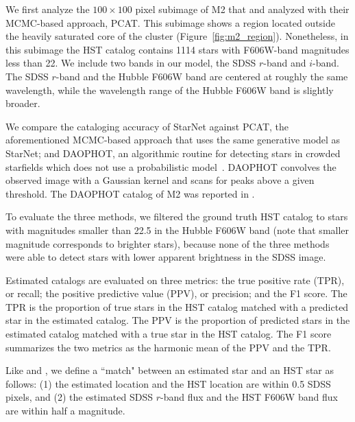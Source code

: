 We first analyze the $100 \times 100$ pixel subimage of M2 that
\cite{Portillo_2017} and \cite{Feder_2019} analyzed with their MCMC-based approach, PCAT.
This subimage shows a region located outside the heavily saturated core of the cluster (Figure~\ref{fig:m2_region}). 
Nonetheless, in this subimage the HST catalog contains 1114 stars with F606W-band magnitudes less than 22.
We include two bands in our model, the SDSS $r$-band and $i$-band.
The SDSS $r$-band and the Hubble F606W band are centered at roughly the same wavelength,
while the wavelength range of the Hubble F606W band is slightly broader.

We compare the cataloging accuracy of StarNet
against PCAT, the aforementioned MCMC-based approach that uses the same generative model as StarNet;
and DAOPHOT, an algorithmic routine for detecting stars in crowded starfields
which does not use a probabilistic model~\citep{stetson2987daophot}.
DAOPHOT convolves the observed image with a Gaussian kernel and scans for peaks above a given threshold.
The DAOPHOT catalog of M2 was reported in \cite{An_2008_m2}.



To evaluate the three methods, we filtered the ground truth HST catalog to stars with magnitudes smaller than 22.5 in the Hubble F606W band
(note that smaller magnitude corresponds to brighter stars),
because none of the three methods were able to detect stars
with lower apparent brightness in the SDSS image.


Estimated catalogs are evaluated on three metrics: the true positive rate (TPR), or recall;
the positive predictive value (PPV), or precision;
and the F1 score.
The TPR is the proportion of true stars in the HST catalog matched with a predicted star in the estimated catalog.
The PPV is the proportion of predicted stars in the estimated catalog matched with a true star in the HST catalog.
The F1 score summarizes the two metrics as the harmonic mean of the PPV and the TPR.

Like \cite{Portillo_2017} and \cite{Feder_2019}, we define a ``match" between an estimated star
and an HST star as follows: (1) the estimated location and the HST location are within 0.5 SDSS pixels,
and (2) the estimated SDSS $r$-band flux and the HST F606W band flux are within half a magnitude.


